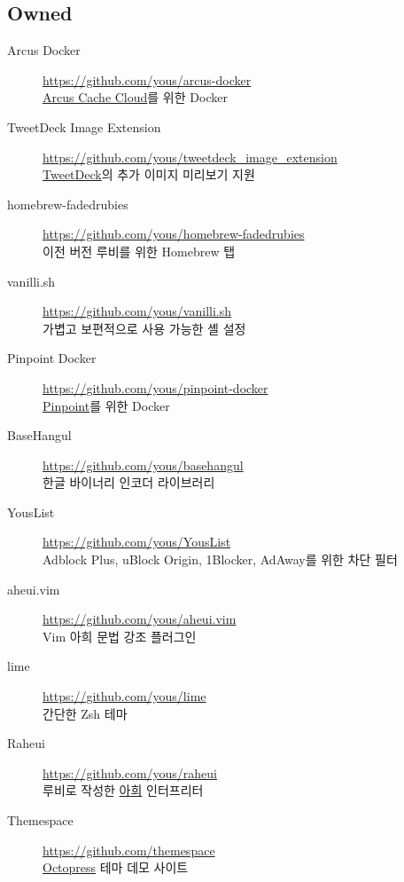 \documentclass[a4paper,10pt]{article}
\begin{document}
\subsection{Owned}
\begin{description}
  \item[Arcus Docker] \url{https://github.com/yous/arcus-docker} \\
    \href{https://github.com/naver/arcus}{Arcus Cache Cloud}를 위한 Docker
  \item[TweetDeck Image Extension] \url{https://github.com/yous/tweetdeck_image_extension} \\
    \href{https://tweetdeck.twitter.com}{TweetDeck}의 추가 이미지 미리보기 지원
  \item[homebrew-fadedrubies] \url{https://github.com/yous/homebrew-fadedrubies} \\
    이전 버전 루비를 위한 Homebrew 탭
  \item[vanilli.sh] \url{https://github.com/yous/vanilli.sh} \\
    가볍고 보편적으로 사용 가능한 셸 설정
  \item[Pinpoint Docker] \url{https://github.com/yous/pinpoint-docker} \\
    \href{https://github.com/naver/pinpoint}{Pinpoint}를 위한 Docker
  \item[BaseHangul] \url{https://github.com/yous/basehangul} \\
    한글 바이너리 인코더 라이브러리
  \item[YousList] \url{https://github.com/yous/YousList} \\
    Adblock Plus, uBlock Origin, 1Blocker, AdAway를 위한 차단 필터
  \item[aheui.vim] \url{https://github.com/yous/aheui.vim} \\
    Vim 아희 문법 강조 플러그인
  \item[lime] \url{https://github.com/yous/lime} \\
    간단한 Zsh 테마
  \item[Raheui] \url{https://github.com/yous/raheui} \\
    루비로 작성한 \href{http://aheui.github.io}{아희} 인터프리터
  \item[Themespace] \url{https://github.com/themespace} \\
    \href{http://octopress.org}{Octopress} 테마 데모 사이트
\end{description}
\end{document}
